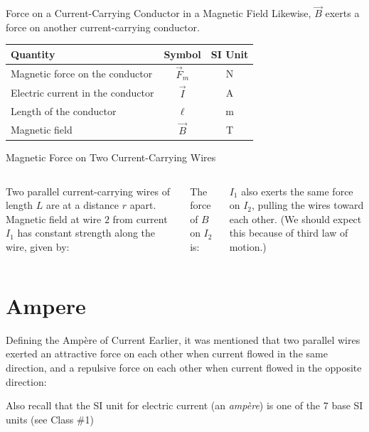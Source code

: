 \documentclass[12pt,aspectratio=169]{beamer}
\begin{document}
\begin{frame}{Force on a Current-Carrying Conductor in a Magnetic Field}
  Likewise, $\vec B$ exerts a force on another current-carrying conductor.

  \begin{center}
    \begin{tabular}{l|c|c}
      \rowcolor{pink}
      \textbf{Quantity} & \textbf{Symbol} & \textbf{SI Unit} \\ \hline
      Magnetic force on the conductor   & $\vec F_m$ & \si\newton \\
      Electric current in the conductor & $\vec I$   & \si\ampere \\
      Length of the conductor           & $\ell$     & \si\metre \\
      Magnetic field                    & $\vec B$   & \si\tesla
    \end{tabular}
  \end{center}
\end{frame}



\begin{frame}{Magnetic Force on Two Current-Carrying Wires}
  \begin{columns}

    Two parallel current-carrying wires of length $L$ are at a distance $r$
    apart. Magnetic field at wire $2$ from current $I_1$ has constant strength
    along the wire, given by:


    The force of $B$ on $I_2$ is:


    $I_1$ also exerts the same force on $I_2$, pulling the wires toward each
    other. (We should expect this because of third law of motion.)
  \end{columns}
\end{frame}



\section{Ampere}

\begin{frame}{Defining the Amp\`{e}re of Current}
  Earlier, it was mentioned that two parallel wires exerted an attractive force
  on each other when current flowed in the same direction, and a repulsive
  force on each other when current flowed in the opposite direction:
  \begin{center}
  \end{center}
  \vspace{-.2in}Also recall that the SI unit for electric current (an
  \emph{amp\`{e}re}) is one of the 7 base SI units (see Class \#1)
\end{frame}
\end{document}
